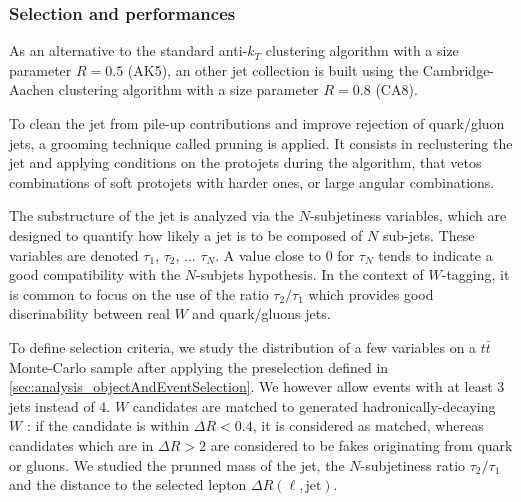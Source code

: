             \subsubsection{Selection and performances}

            As an alternative to the standard anti-$k_T$ clustering algorithm with a 
            size parameter $R = 0.5$ (AK5), an other jet collection is built using the 
            Cambridge-Aachen clustering algorithm with a size parameter $R = 0.8$ (CA8).
            
            To clean the jet from pile-up contributions and improve rejection of 
            quark/gluon jets, a grooming technique called pruning is applied. It 
            consists in reclustering the jet and applying 
            conditions on the protojets during the algorithm, that vetos combinations of
            soft protojets with harder ones, or large angular combinations. 
           
            The substructure of the jet is analyzed via the $N$-subjetiness variables,
            which are designed to quantify how likely a jet is to be composed of $N$
            sub-jets.  These variables are denoted $\tau_1$,
            $\tau_2$, ... $\tau_N$. A value close to 0 for $\tau_N$ tends to indicate
            a good compatibility with the $N$-subjets hypothesis. In the context of 
            $W$-tagging, it is common to focus on the use of the ratio $\tau_2/\tau_1$ 
            which provides good discrinability between real $W$ and quark/gluons jets.

            To define selection criteria, we study the distribution of a few variables
            on a $t\bar{t}$ Monte-Carlo sample after applying the preselection defined in 
            \ref{sec:analysis_objectAndEventSelection}. We however allow events with at 
            least 3 jets instead of 4. $W$ candidates are matched to generated 
            hadronically-decaying $W$ : if the candidate is within $\Delta R < 0.4$, it
            is considered as matched, whereas candidates which are in $\Delta R > 2$ are
            considered to be fakes originating from quark or gluons. We studied the 
            prunned mass of the jet, the $N$-subjetiness ratio $\tau_2 / \tau_1$ and the 
            distance to the selected lepton $\Delta R (\ell,\text{jet})$.

